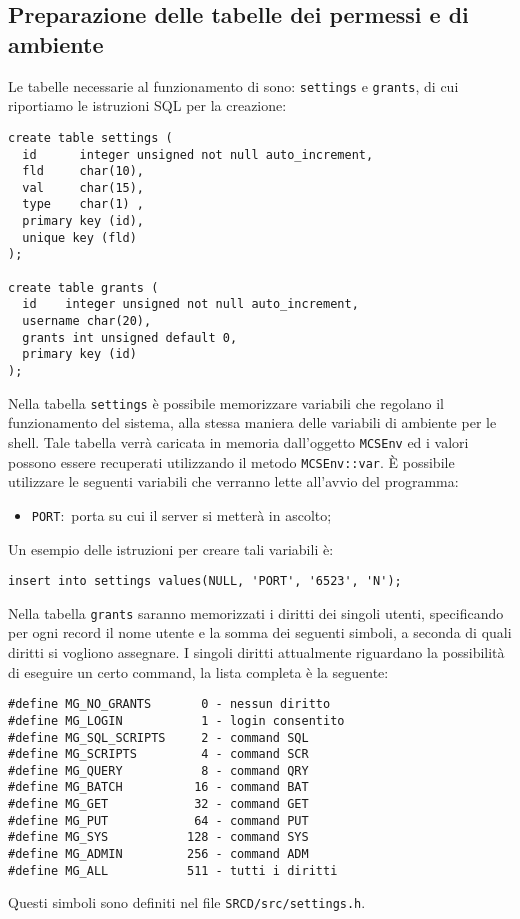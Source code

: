 \subsection{Preparazione delle tabelle dei permessi e di ambiente}
Le tabelle necessarie al funzionamento di \mcs sono:
\verb|settings| e \verb|grants|, di cui riportiamo le istruzioni SQL
per la creazione:
\begin{verbatim}
create table settings (
  id      integer unsigned not null auto_increment,
  fld     char(10),
  val     char(15),
  type    char(1) ,
  primary key (id),
  unique key (fld)
);

create table grants (
  id    integer unsigned not null auto_increment,
  username char(20),
  grants int unsigned default 0,
  primary key (id)
);
\end{verbatim}
%
Nella tabella \verb|settings| \`e possibile memorizzare variabili che
regolano il funzionamento del sistema, alla stessa maniera delle
variabili di ambiente per le shell. Tale tabella verr\`a caricata in
memoria dall'oggetto \verb|MCSEnv| ed i valori possono essere
recuperati utilizzando il metodo \verb|MCSEnv::var|. \`E possibile
utilizzare le seguenti variabili che verranno lette all'avvio del
programma:

\begin{itemize}
\item \verb|PORT|: porta su cui il server \mcs si metter\`a in
  ascolto;
\end{itemize}

Un esempio delle istruzioni per creare tali variabili \`e:
\begin{verbatim}
insert into settings values(NULL, 'PORT', '6523', 'N');
\end{verbatim}
%
Nella tabella \verb|grants| saranno memorizzati i diritti dei singoli
utenti, specificando per ogni record il nome utente e la somma dei
seguenti simboli, a seconda di quali diritti si vogliono assegnare. I
singoli diritti attualmente riguardano la possibilit\`a di eseguire un
certo command, la lista completa \`e la seguente:

\begin{verbatim}
#define MG_NO_GRANTS       0 - nessun diritto
#define MG_LOGIN           1 - login consentito
#define MG_SQL_SCRIPTS     2 - command SQL
#define MG_SCRIPTS         4 - command SCR
#define MG_QUERY           8 - command QRY
#define MG_BATCH          16 - command BAT
#define MG_GET            32 - command GET
#define MG_PUT            64 - command PUT
#define MG_SYS           128 - command SYS
#define MG_ADMIN         256 - command ADM
#define MG_ALL           511 - tutti i diritti
\end{verbatim}
%
Questi simboli sono definiti nel file \verb|SRCD/src/settings.h|.

